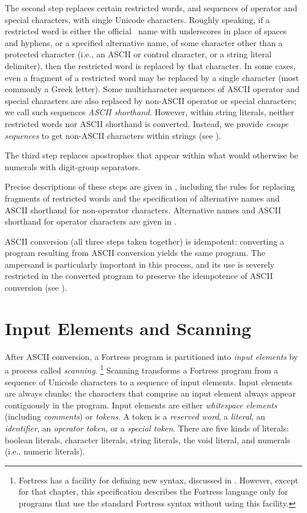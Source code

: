 The second step replaces certain restricted words,
and sequences of operator and special characters,
with single Unicode characters.
Roughly speaking,
if a restricted word is
either the official \unicode\ name
with underscores in place of spaces and hyphens,
or a specified alternative name, of some character
other than a protected character
(i.e., an ASCII or control character, or a string literal delimiter),
then the restricted word is replaced by that character.
In some cases,
even a fragment of a restricted word may be replaced by a single character
(most commonly a Greek letter).
Some multicharacter sequences of ASCII operator and special characters
are also replaced by non-ASCII operator or special characters;
we call such sequences \emph{ASCII shorthand}.
However,
within string literals,
neither restricted words
nor ASCII shorthand is converted.
Instead, we provide \emph{escape sequences}
to get non-ASCII characters within strings
(see ).

The third step replaces apostrophes
that appear within what would otherwise be numerals
with digit-group separators.

Precise descriptions of these steps are
given in ,
including the rules for replacing fragments of restricted words
and the specification of alternative names and ASCII shorthand
for non-operator characters.
Alternative names and ASCII shorthand for operator characters
are given in .

ASCII conversion (all three steps taken together) is idempotent:
converting a program resulting from ASCII conversion
yields the same program.
The ampersand is particularly important
in this process,
and its use is severely restricted in the converted program
to preserve the idempotence of ASCII conversion
(see ).


\section{Input Elements and Scanning}

After ASCII conversion, a
Fortress program is partitioned into
\emph{input elements}
by a process called \emph{scanning}.
\footnote{Fortress has a facility for defining new syntax,
discussed in .
However, except for that chapter, this specification
describes the Fortress language
only for programs that use the standard Fortress syntax
without using this facility.}
Scanning transforms a Fortress program
from a sequence of Unicode characters
to a sequence of input elements.
Input elements are always chunks:
the characters that comprise an input element
always appear contiguously in the program.
Input elements are either
\emph{whitespace elements}
(including \emph{comments})
or \emph{tokens}.
A token is
a \emph{reserved word},
a \emph{literal},
an \emph{identifier},
an \emph{operator token},
or a \emph{special token}.
There are five kinds of literals:
boolean literals,
character literals,
string literals,
the void literal,
and numerals (i.e., numeric literals).

